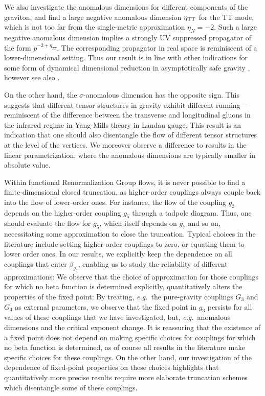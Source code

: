 \documentclass[11pt]{book} %
\newcommand\eg{\textit{e.g.}\ }
\numberwithin{equation}{chapter}
\begin{document}
We also investigate the anomalous dimensions for different components of the graviton,
and find a large negative anomalous dimension $\eta_{\rm TT}$ for the TT mode,
which is not too far from the single-metric approximation $\eta_N=-2$.
Such a large negative anomalous dimension implies a strongly UV suppressed propagator of the form
$p^{-2+\eta_{TT}}$. The corresponding propagator in real space is reminiscent of a lower-dimensional setting.
Thus our result is in line with other indications for some form of dynamical dimensional reduction
in asymptotically safe gravity
\cite{Lauscher:2001ya, Lauscher:2005qz, Reuter:2011ah, Rechenberger:2012pm, Calcagni:2013vsa},
however see also \cite{DOdorico:2015jtl}.

On the other hand, the  $\sigma$-anomalous dimension has the opposite sign.
This suggests that different tensor structures in gravity exhibit different running---reminiscent
of the difference between the transverse and longitudinal gluons in the infrared regime
in Yang-Mills theory in Landau gauge.
This result is an indication that one should also disentangle the flow of different tensor structures
at the level of the vertices.
We moreover observe a difference to results in the linear parametrization,
where the anomalous dimensions are typically smaller in  absolute value.

Within functional Renormalization Group flows, it is never possible to find a finite-dimensional
closed truncation, as higher-order couplings always couple back into the flow of lower-order ones.
For instance, the flow of the coupling $g_3$ depends on the higher-order coupling $g_5$ through
a tadpole diagram. Thus, one should evaluate the flow for $g_5$,
which itself depends on $g_7$ and so on, necessitating some approximation to close the truncation.
Typical choices in the literature include setting higher-order couplings to zero,
or equating them to lower order ones. In our results,
we explicitly keep the dependence on all couplings that enter $\beta_{g_3}$,
enabling us to study the reliability of different approximations:
We observe that the choice of approximation for those couplings for which no beta function is
determined explicitly, quantitatively alters the properties of the fixed point: By treating,
\eg the pure-gravity couplings $G_3$ and $G_4$ as external parameters, we observe that the
fixed point in $g_3$ persists for all values of these couplings that we have investigated,
but, \eg anomalous dimensions and the critical exponent change.
It is reassuring that the existence of a fixed point does not  depend on making specific choices
for couplings for which no beta function is determined, as of course all results in the literature
make specific choices for these couplings. On the other hand,
our investigation of the dependence of fixed-point properties on these choices highlights that quantitatively
more precise results require
 more elaborate truncation schemes which disentangle some of these couplings.
\end{document}
